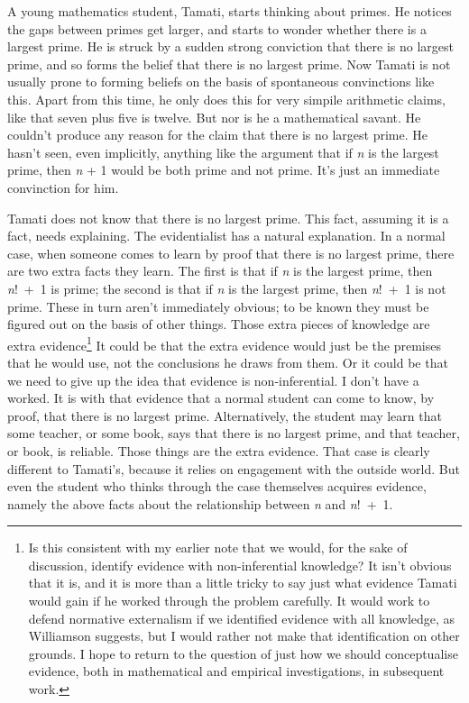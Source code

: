 \documentclass[
  10pt,
  letterpaper,
  twoside]{scrbook}
\begin{document}
A young mathematics student, {Tamati}, starts thinking about primes. He
notices the gaps between primes get larger, and starts to wonder whether
there is a largest prime. He is struck by a sudden strong conviction
that there is no largest prime, and so forms the belief that there is no
largest prime. Now {Tamati} is not usually prone to forming beliefs on
the basis of spontaneous convinctions like this. Apart from this time,
he only does this for very simpile arithmetic claims, like that seven
plus five is twelve. But nor is he a mathematical savant. He couldn't
produce any reason for the claim that there is no largest prime. He
hasn't seen, even implicitly, anything like the argument that if
\emph{n} is the largest prime, then \emph{n} + 1 would be both prime and
not prime. It's just an immediate convinction for him.

{Tamati} does not know that there is no largest prime. This fact,
assuming it is a fact, needs explaining. The evidentialist has a natural
explanation. In a normal case, when someone comes to learn by proof that
there is no largest prime, there are two extra facts they learn. The
first is that if \emph{n} is the largest prime, then \emph{n}!~+~1 is
prime; the second is that if \emph{n} is the largest prime, then
\emph{n}!~+~1 is not prime. These in turn aren't immediately obvious; to
be known they must be figured out on the basis of other things. Those
extra pieces of knowledge are extra evidence\footnote{Is this consistent
  with my earlier note that we would, for the sake of discussion,
  identify evidence with non-inferential knowledge? It isn't obvious
  that it is, and it is more than a little tricky to say just what
  evidence {Tamati} would gain if he worked through the problem
  carefully. It would work to defend normative externalism if we
  identified evidence with all knowledge, as Williamson suggests, but I
  would rather not make that identification on other grounds. I hope to
  return to the question of just how we should conceptualise evidence,
  both in mathematical and empirical investigations, in subsequent work.}
It could be that the extra evidence would just be the premises that he
would use, not the conclusions he draws from them. Or it could be that
we need to give up the idea that evidence is non-inferential. I don't
have a worked. It is with that evidence that a normal student can come
to know, by proof, that there is no largest prime. Alternatively, the
student may learn that some teacher, or some book, says that there is no
largest prime, and that teacher, or book, is reliable. Those things are
the extra evidence. That case is clearly different to {Tamati}'s,
because it relies on engagement with the outside world. But even the
student who thinks through the case themselves acquires evidence, namely
the above facts about the relationship between \emph{n} and
\emph{n}!~+~1.
\end{document}
